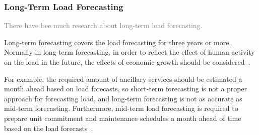 \documentclass[journal]{IEEEtran} %
\begin{document}
%
%
%
%
%
%
%
%
%








\vspace{1.2in}














\subsubsection{Long-Term Load Forecasting}
\textcolor{gray}{There have bee much research about long-term load forecasting.}


Long-term forecasting covers the load forecasting for three years or more. Normally in long-term forecasting, in order to reflect the effect of human activity on the load in the future, the effects of economic growth should be considered~\cite{Hong2014}. 






For example, the required amount of ancillary services should be estimated a month ahead based on load forecasts, so short-term forecasting is not a proper approach for forecasting load, and long-term forecasting is not as accurate as mid-term forecasting. Furthermore, mid-term load forecasting is required to prepare unit commitment and maintenance schedules a month ahead of time based on the load forecasts~\cite{Burger2014}.
\end{document}

